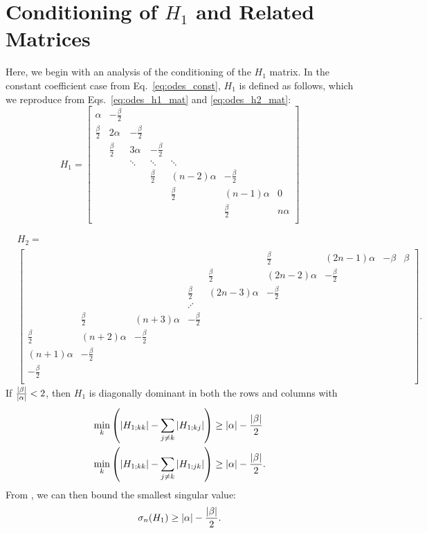 \section{Conditioning of $H_{1}$ and Related Matrices}
\label{sec:odes_h13_cond}

Here, we begin with an analysis of the conditioning of the
$H_{1}$ matrix.
In the constant coefficient case from Eq.~\ref{eq:odes_const},
$H_{1}$ is defined as follows, which we reproduce from
Eqs.~\eqref{eq:odes_h1_mat} and \eqref{eq:odes_h2_mat}:
%
\begin{equation}
    H_{1} = \begin{bmatrix}
        \alpha          & -\frac{\beta}{2}         & \\
        \frac{\beta}{2} & 2\alpha & -\frac{\beta}{2} \\
        & \frac{\beta}{2} & 3\alpha & -\frac{\beta}{2} \\
        & & \ddots & \ddots & \ddots \\
        & & & \frac{\beta}{2} & (n-2)\alpha & -\frac{\beta}{2} \\
        & & & & \frac{\beta}{2} & (n-1)\alpha & 0 \\ 
        & & & & & \frac{\beta}{2} & n\alpha \\
    \end{bmatrix}
\end{equation}

\begin{align}
    &H_{2} = \nonumber\\
    &\begin{bmatrix}
        & & & & & \frac{\beta}{2} & (2n-1)\alpha & -\beta & \beta \\
        & & & & \frac{\beta}{2} & (2n-2)\alpha & -\frac{\beta}{2} \\ 
        & & & \frac{\beta}{2} & (2n-3)\alpha & -\frac{\beta}{2} \\
        & & & \iddots & \\
        & \frac{\beta}{2} & (n+3)\alpha & -\frac{\beta}{2} \\
        \frac{\beta}{2} & (n+2)\alpha & -\frac{\beta}{2} \\
        (n+1)\alpha     & -\frac{\beta}{2}         & \\
        -\frac{\beta}{2}&                          & \\
    \end{bmatrix}.
\end{align}
%
If $\frac{\left| \beta \right|}{\left| \alpha \right|} < 2$, then $H_{1}$
is diagonally dominant in both the rows and columns
with
%
\begin{align}
    \min_{k} \left( \left| H_{1;kk} \right| - \sum_{j\ne k} \left| H_{1;kj} \right| \right)
        &\ge \left| \alpha \right| - \frac{\left| \beta \right|}{2} \nonumber\\
    \min_{k} \left( \left| H_{1;kk} \right| - \sum_{j\ne k} \left| H_{1;jk} \right| \right)
        &\ge \left| \alpha \right| - \frac{\left| \beta \right|}{2}.
\end{align}
%
From \cite{Varah_1975}, we can then bound the smallest
singular value:
%
\begin{equation}
    \sigma_{n}(H_{1}) \ge \left| \alpha \right| - \frac{\left| \beta \right|}{2}.
\end{equation}

